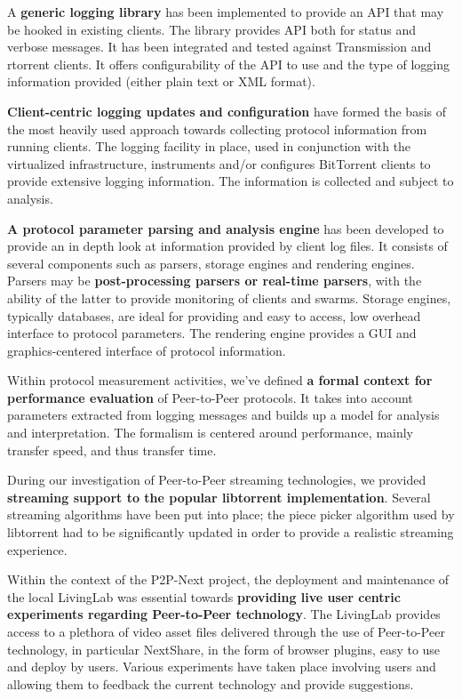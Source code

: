 A \textbf{generic logging library} has been implemented to provide an API that
may be hooked in existing clients. The library provides API both for status
and verbose messages. It has been integrated and tested against Transmission
and rtorrent clients. It offers configurability of the API to use and the type
of logging information provided (either plain text or XML format).

\textbf{Client-centric logging updates and configuration} have formed the
basis of the most heavily used approach towards collecting protocol
information from running clients. The logging facility in place, used in
conjunction with the virtualized infrastructure, instruments and/or configures
BitTorrent clients to provide extensive logging information. The information
is collected and subject to analysis.

\textbf{A protocol parameter parsing and analysis engine} has been developed
to provide an in depth look at information provided by client log files. It
consists of several components such as parsers, storage engines and rendering
engines. Parsers may be \textbf{post-processing parsers or real-time parsers},
with the ability of the latter to provide monitoring of clients and swarms.
Storage engines, typically databases, are ideal for providing and easy to
access, low overhead interface to protocol parameters. The rendering engine
provides a GUI and graphics-centered interface of protocol information.

Within protocol measurement activities, we've defined \textbf{a formal context
for performance evaluation} of Peer-to-Peer protocols. It takes into account
parameters extracted from logging messages and builds up a model for analysis
and interpretation. The formalism is centered around performance, mainly
transfer speed, and thus transfer time.

During our investigation of Peer-to-Peer streaming technologies, we provided
\textbf{streaming support to the popular libtorrent implementation}. Several
streaming algorithms have been put into place; the piece picker algorithm
used by libtorrent had to be significantly updated in order to provide a
realistic streaming experience.

Within the context of the P2P-Next project, the deployment and maintenance of
the local LivingLab was essential towards \textbf{providing live user centric
experiments regarding Peer-to-Peer technology}. The LivingLab provides access
to a plethora of video asset files delivered through the use of Peer-to-Peer
technology, in particular NextShare, in the form of browser plugins, easy to
use and deploy by users. Various experiments have taken place involving users
and allowing them to feedback the current technology and provide suggestions.

